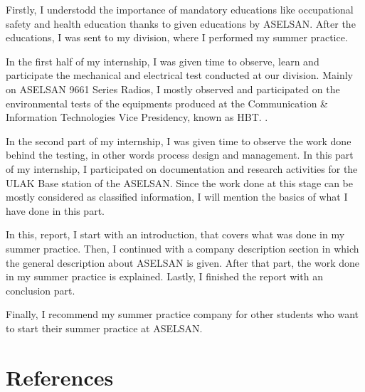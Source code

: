 	Firstly, I understodd the importance of mandatory educations like occupational safety and health education thanks to given educations by ASELSAN. After the educations, I was  sent to my division, where I performed my summer practice.
	
	In the first half of my internship, I was given time to observe, learn and participate the mechanical and electrical test conducted at our division. Mainly on ASELSAN 9661 Series Radios, I mostly observed and participated on the environmental tests of the equipments produced at the Communication \& Information Technologies Vice Presidency, known as HBT. .
	
	In the second part of my internship, I was given time to observe the work done behind the testing, in other words process design and management. In this part of my internship, I participated on documentation and research activities for the ULAK Base station of the ASELSAN. Since the work done at this stage can be mostly considered as classified information, I will mention the basics of what I have done in this part.
	
	In this, report, I start with an introduction, that covers what was done in my summer practice. Then, I continued with a company description section in which the general description about ASELSAN is given. After that part, the work done in my summer practice is explained. Lastly, I finished the report with an conclusion part. 
		
	
	Finally, I recommend my summer practice company for other students who want to start their summer practice at ASELSAN. 

\-\vfill 


\section{References}

